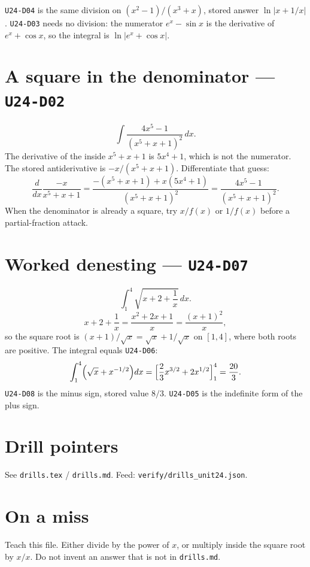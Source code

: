 \texttt{U24-D04} is the same division on $(x^2-1)/(x^3+x)$, stored answer $\ln|x+1/x|$. \texttt{U24-D03} needs no division: the numerator $e^x-\sin x$ is the derivative of $e^x+\cos x$, so the integral is $\ln|e^x+\cos x|$.

\section{A square in the denominator --- \texttt{U24-D02}}
\[
\int\frac{4x^5-1}{(x^5+x+1)^2}\,dx.
\]
The derivative of the inside $x^5+x+1$ is $5x^4+1$, which is not the numerator. The stored antiderivative is $-x/(x^5+x+1)$. Differentiate that guess:
\[
\frac{d}{dx}\frac{-x}{x^5+x+1}=\frac{-(x^5+x+1)+x(5x^4+1)}{(x^5+x+1)^2}=\frac{4x^5-1}{(x^5+x+1)^2}.
\]
When the denominator is already a square, try $x/f(x)$ or $1/f(x)$ before a partial-fraction attack.

\section{Worked denesting --- \texttt{U24-D07}}
\[
\int_1^4\sqrt{x+2+\frac{1}{x}}\,dx.
\]
\[
x+2+\frac{1}{x}=\frac{x^2+2x+1}{x}=\frac{(x+1)^2}{x},
\]
so the square root is $(x+1)/\sqrt{x}=\sqrt{x}+1/\sqrt{x}$ on $[1,4]$, where both roots are positive. The integral equals \texttt{U24-D06}:
\[
\int_1^4\Bigl(\sqrt{x}+x^{-1/2}\Bigr)dx=\Bigl[\frac23 x^{3/2}+2x^{1/2}\Bigr]_1^4=\frac{20}{3}.
\]
\texttt{U24-D08} is the minus sign, stored value $8/3$. \texttt{U24-D05} is the indefinite form of the plus sign.

\section{Drill pointers}
See \texttt{drills.tex} / \texttt{drills.md}. Feed: \texttt{verify/drills\_unit24.json}.

\section*{On a miss}
Teach this file. Either divide by the power of $x$, or multiply inside the square root by $x/x$. Do not invent an answer that is not in \texttt{drills.md}.

